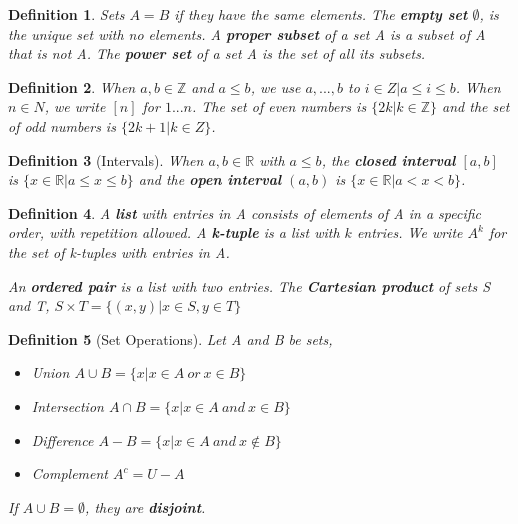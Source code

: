 \documentclass[12pt]{article}
\newtheorem{definition}{Definition}[subsection]
\begin{document}
        \begin{definition}
            Sets $A = B$ if they have the same elements. The \textbf{empty set} $\emptyset$, is the unique set with no elements. A \textbf{proper subset} of a set A is a subset of A that is not A. The \textbf{power set} of a set A is the set of all its subsets.
        \end{definition}

        \begin{definition}
            When $a, b \in \mathbb{Z}$ and $a \leq b$, we use ${a, ..., b}$ to ${i \in Z | a \leq i \leq b}$. When $n \in N$, we write $[n]$ for ${1 ... n}$. The set of even numbers is $\{2k | k \in \mathbb{Z}\}$ and the set of odd numbers is $\{2k + 1 | k \in Z\}$.
        \end{definition}

        \begin{definition}[Intervals]
            When $a, b \in \mathbb{R}$ with $a \leq b$, the \textbf{closed interval} $[a, b]$ is $\{x \in \mathbb{R} | a \leq x \leq b\}$ and the \textbf{open interval} $(a, b)$ is $\{x \in \mathbb{R} | a < x < b\}$.
        \end{definition}

        \begin{definition}
            A \textbf{list} with entries in A consists of elements of A in a specific order, with repetition allowed. A \textbf{k-tuple} is a list with $k$ entries. We write $A^k$ for the set of k-tuples with entries in A.

            An \textbf{ordered pair} is a list with two entries. The \textbf{Cartesian product} of sets S and T, $S \times T = \{(x, y)| x \in S, y \in T\}$
        \end{definition}

        \begin{definition}[Set Operations]
            Let A and B be sets,
            \begin{itemize}
                \item Union $A \cup B = \{x | x \in A\ or\ x \in B\}$
                \item Intersection $A \cap B = \{x | x \in A\ and\ x \in B\}$
                \item Difference $A - B = \{x | x \in A\ and\ x \notin B\}$
                \item Complement $A^c = U - A$
            \end{itemize}
            If $A \cup B = \emptyset$, they are \textbf{disjoint}.
        \end{definition}
\end{document}
